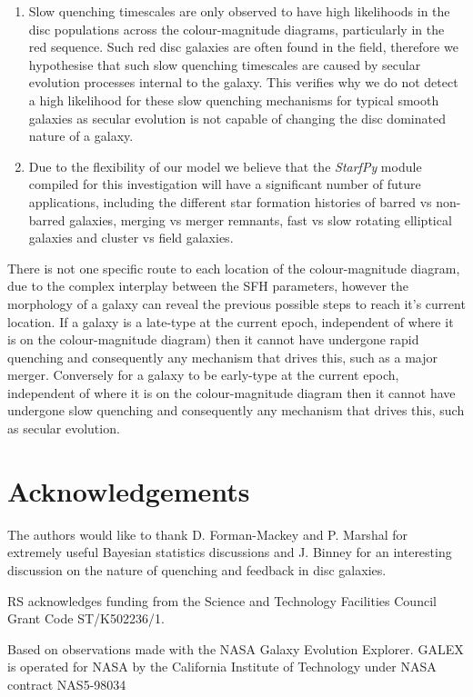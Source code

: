 \documentclass[useAMS,usenatbib]{mn2e}
\begin{document}
\begin{enumerate}
\item Slow quenching timescales are only observed to have high likelihoods in the disc populations across the colour-magnitude diagrams, particularly in the red sequence. Such red disc galaxies are often found in the field, therefore we hypothesise that such slow quenching timescales are caused by secular evolution processes internal to the galaxy. This verifies why we do not detect a high likelihood for these slow quenching mechanisms for typical smooth galaxies as secular evolution is not capable of changing the disc dominated nature of a galaxy.
\item Due to the flexibility of our model we believe that the \emph{StarfPy} module compiled for this investigation will have a significant number of future applications, including the different star formation histories of barred vs non-barred galaxies, merging vs merger remnants, fast vs slow rotating elliptical galaxies and cluster vs field galaxies. 
\end{enumerate}

There is not one specific route to each location of the colour-magnitude diagram, due to the complex interplay between the SFH parameters, however the morphology of a galaxy can reveal the previous possible steps to reach it's current location. If a galaxy is a late-type at the current epoch, independent of where it is on the colour-magnitude diagram) then it cannot have undergone rapid quenching and consequently any mechanism that drives this, such as a major merger. Conversely for a galaxy to be early-type at the current epoch, independent of where it is on the colour-magnitude diagram then it cannot have undergone slow quenching and consequently any mechanism that drives this, such as secular evolution. 

\section*{Acknowledgements}
The authors would like to thank D. Forman-Mackey and P. Marshal for extremely useful Bayesian statistics discussions and J. Binney for an interesting discussion on the nature of quenching and feedback in disc galaxies. 

RS acknowledges funding from the Science and Technology Facilities Council Grant Code ST/K502236/1.

Based on observations made with the NASA Galaxy Evolution Explorer.  GALEX is operated for NASA by the California Institute of Technology under NASA contract NAS5-98034
\end{document}
